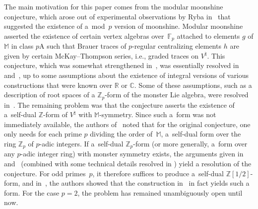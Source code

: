 \documentclass[pdftex]{sigma}
\newcommand{\bC}{\mathbb{C}}
\newcommand{\bF}{\mathbb{F}}
\newcommand{\bM}{\mathbb{M}}
\newcommand{\bR}{\mathbb{R}}
\newcommand{\bZ}{\mathbb{Z}}
\theoremstyle{definition}
\begin{document}
The main motivation for this paper comes from the modular moonshine conjecture, which arose out of experimental observations by Ryba in~\cite{R96} that suggested the existence of a~mod~$p$ version of moonshine. Modular moonshine asserted the existence of certain vertex algebras over~$\bF_p$ attached to elements $g$ of $\bM$ in class $p$A such that Brauer traces of $p$-regular centralizing elements $h$ are given by certain McKay--Thompson series, i.e., graded traces on $V^\natural$. This conjecture, which was somewhat strengthened in~\cite{BR96}, was essentially resolved in~\cite{BR96} and~\cite{B98}, up to some assumptions about the existence of integral versions of various constructions that were known over $\bR$ or $\bC$. Some of these assumptions, such as a description of root spaces of a $\bZ_p$-form of the monster Lie algebra, were resolved in~\cite{B99}. The remaining problem was that the conjecture asserts the existence of a~self-dual $\bZ$-form of $V^\natural$ with $\bM$-symmetry. Since such a~form was not immediately available, the authors of~\cite{BR96} noted that for the original conjecture, one only needs for each prime $p$ dividing the order of~$\bM$, a~self-dual form over the ring $\bZ_p$ of $p$-adic integers. If a~self-dual $\bZ_p$-form (or more generally, a~form over any $p$-adic integer ring) with monster symmetry exists, the arguments given in~\cite{BR96} and~\cite{B98} (combined with some technical details resolved in \cite{B99}) yield a resolution of the conjecture. For odd primes~$p$, it therefore suffices to produce a~self-dual $\bZ[1/2]$-form, and in~\cite{BR96}, the authors showed that the construction in~\cite{FLM88} in fact yields such a form. For the case $p=2$, the problem has remained unambiguously open until now.
\end{document}
